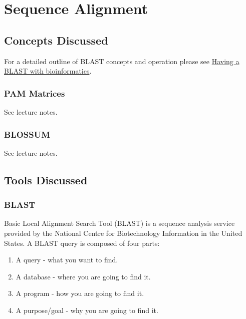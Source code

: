 
\chapter{Sequence Alignment}

\label{Chapter1}

\newcommand{\keyword}[1]{\textbf{#1}}
\newcommand{\tabhead}[1]{\textbf{#1}}
\newcommand{\code}[1]{\texttt{#1}}
\newcommand{\file}[1]{\texttt{\bfseries#1}}
\newcommand{\option}[1]{\texttt{\itshape#1}}

\section{Concepts Discussed}

For a detailed outline of BLAST concepts and operation please see \href{https://genomebiology.biomedcentral.com/track/pdf/10.1186/gb-2001-2-10-reviews2002}{Having a BLAST with bioinformatics}.

    \subsection[PAM Matrices]{PAM Matrices}
    
    See lecture notes.\autocite{T1}
    
    \subsection[BLOSSUM]{BLOSSUM}

    See lecture notes.\autocite{T1}



\section{Tools Discussed}

    \subsection{BLAST}

    Basic Local Alignment Search Tool (BLAST) is a sequence analysis service provided by the National Centre for Biotechnology Information in the United States. A BLAST query is composed  of four parts:

    \begin{enumerate}
        \item{A query - what you want to find.}
        \item{A database - where you are going to find it.}
        \item{A program - how you are going to find it.}
        \item{A purpose/goal - why you are going to find it.}
    \end{enumerate}

